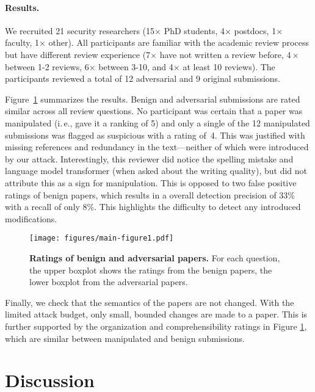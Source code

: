 \documentclass[letterpaper,twocolumn,10pt]{article}
\newcommand{\ie}{i.\,e.}
\begin{document}
\paragraph{Results.} We recruited 21 security researchers (15$\times$ {PhD\EndAccSupp{}} students, 4$\times$ postdocs, 1$\times$ {faculty\EndAccSupp{}}, 1$\times$ other). All participants are {familiar\EndAccSupp{}} with the academic review process but have different review experience (7$\times$ have not written a review before, $4\times$ between 1-2 reviews, 6$\times$ between 3-10, and 4$\times$ at least 10 reviews). 
The participants reviewed a total of 12 adversarial and 9 original submissions.

Figure~\ref{fig:user-study-v2} summarizes the results. Benign and adversarial submissions are rated similar across all review questions. No participant was certain that a paper was manipulated (\ie, gave it a ranking of 5) and only a single of the 12 manipulated submissions was flagged as suspicious with a rating of~4. This was justified with missing references and redundancy in the text---neither of which were introduced by our attack. Interestingly, this reviewer did notice the spelling mistake and language model transformer (when asked about the writing quality), but did not attribute this as a sign for manipulation. This is opposed to two false positive ratings of benign papers, which results in a overall detection precision of 33\% with a recall of only 8\%. This highlights the difficulty to detect any introduced modifications.

\begin{figure}[t]
    \centering
\texttt{[image: figures/main-figure1.pdf]}
    \vspace{-0.75em}
    \caption{\textbf{Ratings of benign and adversarial papers.} For each question, the upper boxplot shows the ratings from the benign papers, the lower boxplot from the adversarial papers.}
    \label{fig:user-study-v2}
\end{figure}

Finally, we check that the semantics of the papers are not changed. With the limited attack budget, only small, bounded changes are made to a paper. 
This is further supported by the organization and comprehensibility ratings in Figure \ref{fig:user-study-v2}, which are similar between manipulated and benign submissions. \section{Discussion}
\label{sec:discussion}
\end{document}
